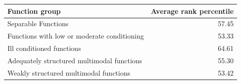 \begin{tabular}{lr}
\toprule
Function group & Average rank percentile \\
\midrule
Separable Functions & 57.45 \\
Functions with low or moderate conditioning & 53.33 \\
Ill conditioned functions & 64.61 \\
Adequately structured multimodal functions & 55.30 \\
Weakly structured multimodal functions & 53.42 \\
\bottomrule
\end{tabular}
